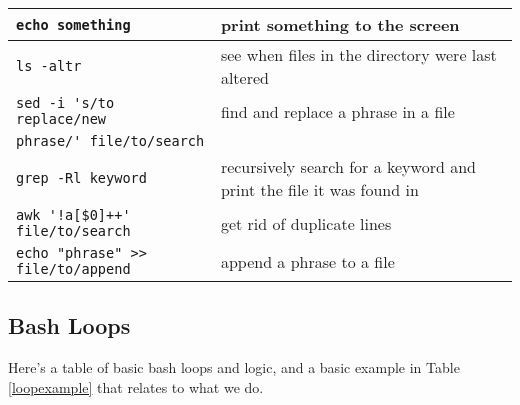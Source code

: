 \documentclass{article}
\begin{document}
\begin{center}
\begin{longtable}{||p{5.5cm}|p{5.5cm}||}
    \verb|echo something| & print something to the screen \\\hline
    \verb|ls -altr| & see when files in the directory were last
                      altered \\\hline
    \verb|sed -i 's/to replace/new| & find and replace a phrase in a
                                      file \\
    \verb|phrase/' file/to/search| & \\ \hline
    \verb|grep -Rl keyword| & recursively search for a keyword and
                              print the file it was found in \\\hline
    \verb|awk '!a[$0]++' file/to/search| & get rid of duplicate lines
    \\\hline
    \verb|echo "phrase" >> file/to/append| & append a phrase to a file \\\hline
  \end{longtable}
\end{center}

\subsection*{Bash Loops}

Here's a table of basic bash loops and logic, and a basic example in
Table \ref{loopexample} that relates to what we do. 
\end{document}
